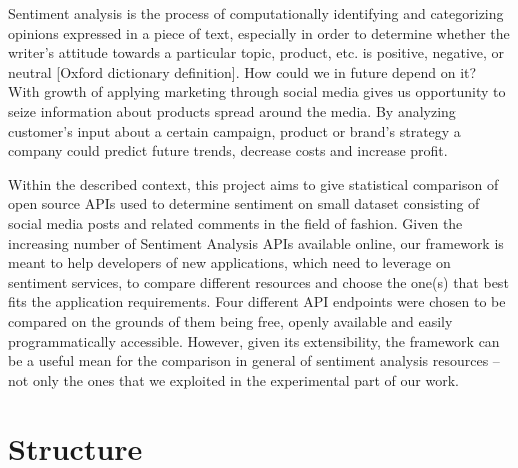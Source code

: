 	Sentiment analysis is the process of computationally identifying and categorizing opinions expressed in a piece of text, especially in order to determine whether the writer's attitude towards a particular topic, product, etc. is positive, negative, or neutral [Oxford dictionary definition]. How could we in future depend on it? With growth of applying marketing through social media gives us opportunity to seize information about products spread around the media. By analyzing customer's input about a certain campaign, product or brand's strategy a company could predict future trends, decrease costs and increase profit.
	
	Within the described context, this project aims to give statistical comparison of open source APIs used to determine sentiment on small dataset consisting of social media posts and related comments in the field of fashion. Given the increasing number of Sentiment Analysis APIs available online, our framework is meant to help developers of new applications, which need to leverage on sentiment services, to compare different resources and choose the one(s) that best fits the application requirements. 
	Four different API endpoints were chosen to be compared on the grounds of them being free, openly available and easily programmatically accessible.
	However, given its extensibility, the framework can be a useful mean for the comparison in general of sentiment analysis resources -- not only the ones that we exploited in the experimental part of our work. 

\section{Structure}

